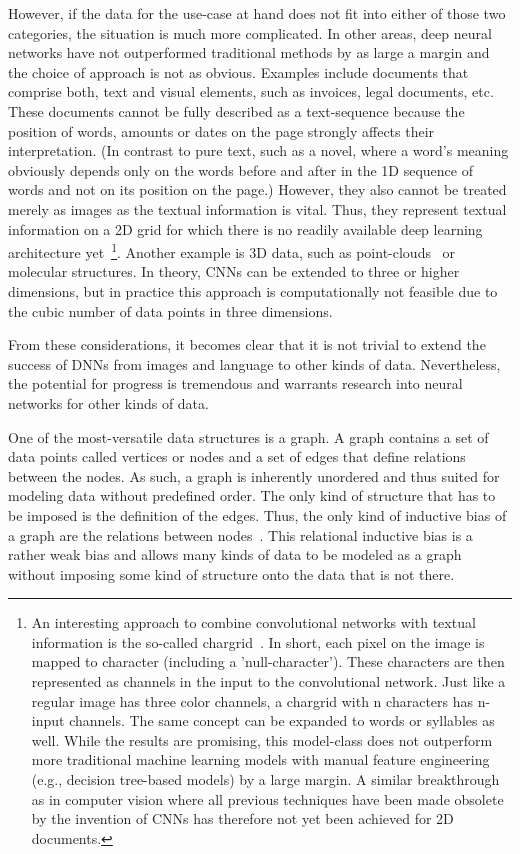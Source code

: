 However, if the data for the use-case at hand does not fit into either of those two categories, the situation is much more complicated. In other areas, deep neural networks have not outperformed traditional methods by as large a margin and the choice of approach is not as obvious. Examples include documents that comprise both, text and visual elements, such as invoices, legal documents, etc. These documents cannot be fully described as a text-sequence because the position of words, amounts or dates on the page strongly affects their interpretation. (In contrast to pure text, such as a novel, where a word's meaning obviously depends only on the words before and after in the 1D sequence of words and not on its position on the page.) However, they also cannot be treated merely as images as the textual information is vital. Thus, they represent textual information on a 2D grid for which there is no readily available deep learning architecture yet~\footnote{
	An interesting approach to combine convolutional networks with textual information is the so-called chargrid~\cite{Katti2020}. In short, each pixel on the image is mapped to character (including a 'null-character'). These characters are then represented as channels in the input to the convolutional network. Just like a regular image has three color channels, a chargrid with n characters has n-input channels. The same concept can be expanded to words or syllables as well. While the results are promising, this model-class does not outperform more traditional machine learning models with manual feature engineering (e.g., decision tree-based models) by a large margin. A similar breakthrough as in computer vision where all previous techniques have been made obsolete by the invention of CNNs has therefore not yet been achieved for 2D documents.
}. Another example is 3D data, such as point-clouds~\cite{Charles2017} or molecular structures. In theory, CNNs can be extended to three or higher dimensions, but in practice this approach is computationally not feasible due to the cubic number of data points in three dimensions.

From these considerations, it becomes clear that it is not trivial to extend the success of DNNs from images and language to other kinds of data. Nevertheless, the potential for progress is tremendous and warrants research into neural networks for other kinds of data.

One of the most-versatile data structures is a graph. A graph contains a set of data points called vertices or nodes and a set of edges that define relations between the nodes. As such, a graph is inherently unordered and thus suited for modeling data without predefined order. The only kind of structure that has to be imposed is the definition of the edges. Thus, the only kind of inductive bias of a graph are the relations between nodes~\cite{Battaglia2018}. This relational inductive bias is a rather weak bias and allows many kinds of data to be modeled as a graph without imposing some kind of structure onto the data that is not there.

